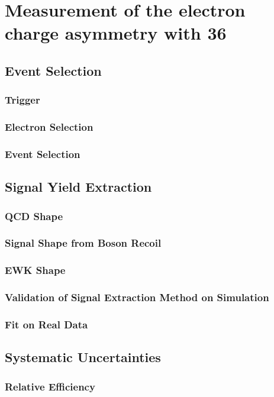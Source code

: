 \chapter{ 
Measurement of the electron charge asymmetry with \unit{36}{\invpb} }

\section{Event Selection}
\subsection{Trigger}
\subsection{Electron Selection}
\subsection{Event Selection}

\section{Signal Yield Extraction}
\subsection{QCD \ETm Shape}
\subsection{Signal \ETm Shape from Boson Recoil}
\subsection{EWK \ETm Shape}
\subsection{Validation of Signal Extraction Method on Simulation}
\subsection{Fit on Real Data}

\section{Systematic Uncertainties}
\subsection{Relative Efficiency}
